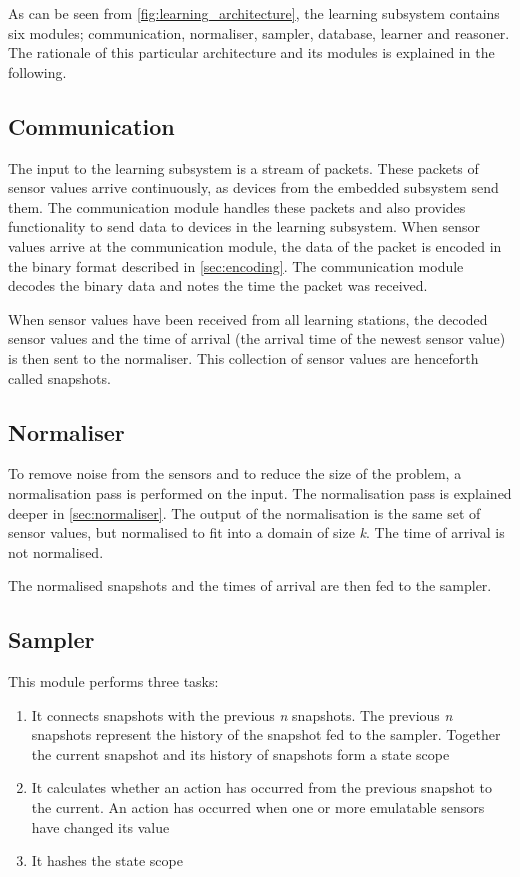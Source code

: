 As can be seen from \cref{fig:learning_architecture}, the learning subsystem contains six modules; communication, normaliser, sampler, database, learner and reasoner. The rationale of this particular architecture and its modules is explained in the following.

\subsection{Communication}
The input to the learning subsystem is a stream of packets. These packets of sensor values arrive continuously, as devices from the embedded subsystem send them. The communication module handles these packets and also provides functionality to send data to devices in the learning subsystem. When sensor values arrive at the communication module, the data of the packet is encoded in the binary format described in \cref{sec:encoding}. The communication module decodes the binary data and notes the time the packet was received.

When sensor values have been received from all learning stations, the decoded sensor values and the time of arrival (the arrival time of the newest sensor value) is then sent to the normaliser. This collection of sensor values are henceforth called snapshots.

\subsection{Normaliser}
To remove noise from the sensors and to reduce the size of the problem, a normalisation pass is performed on the input. The normalisation pass is explained deeper in \cref{sec:normaliser}. The output of the normalisation is the same set of sensor values, but normalised to fit into a domain of size \emph{k}. The time of arrival is not normalised.

The normalised snapshots and the times of arrival are then fed to the sampler.

\subsection{Sampler}
This module performs three tasks:

\begin{enumerate}
\item It connects snapshots with the previous \emph{n} snapshots. The previous \emph{n} snapshots represent the history of the snapshot fed to the sampler. Together the current snapshot and its history of snapshots form a state scope
\item It calculates whether an action has occurred from the previous snapshot to the current. An action has occurred when one or more emulatable sensors have changed its value
\item It hashes the state scope
\end{enumerate}

